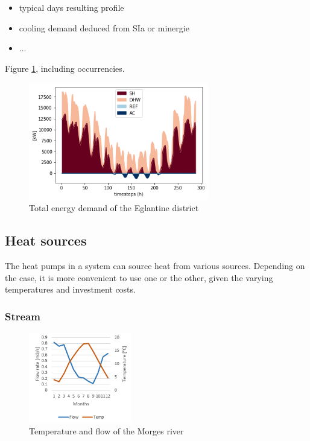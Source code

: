 \documentclass{article}
\begin{document}
\begin{itemize}
	\item typical days resulting profile
	\item cooling demand deduced from SIa or minergie
	\item ...
\end{itemize}

Figure \ref{fig:energyDemand}, including occurrencies. 

\begin{figure}[h!]
	\centering
	\includegraphics[width=0.7\textwidth]{energy_demand.png}
	\caption{Total energy demand of the Eglantine district}
	\label{fig:energyDemand}
\end{figure}


\subsection{Heat sources}
The heat pumps in a system can source heat from various sources. Depending on the case, it is more convenient to use one or the other, given the varying temperatures and investment costs.

\subsubsection{Stream}
\begin{figure} 
	\vspace{-20pt}
	\centering
	\includegraphics[width=0.4\textwidth]{river.png}
	\caption{Temperature and flow of the Morges river}
	\label{fig:river}
	\vspace{-10pt}
\end{figure}
\end{document}
